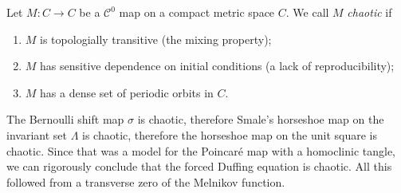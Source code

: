 \begin{definition}
	Let $M:C\to C$ be a $\mathcal{C}^{0}$ map on a compact metric space $C$. We call $M$ \emph{chaotic} if
	\begin{enumerate}
		\item $M$ is topologially transitive (the mixing property);
		\item $M$ has sensitive dependence on initial conditions (a lack of reproducibility);
		\item $M$ has a dense set of periodic orbits in $C$.
	\end{enumerate}
\end{definition}
The Bernoulli shift map $\sigma$ is chaotic, therefore Smale's horseshoe map on the invariant set $\Lambda$ is chaotic, therefore the horseshoe map on the unit square is chaotic. Since that was a model for the Poincaré map with a homoclinic tangle, we can rigorously conclude that the forced Duffing equation is chaotic. All this followed from a transverse zero of the Melnikov function.
